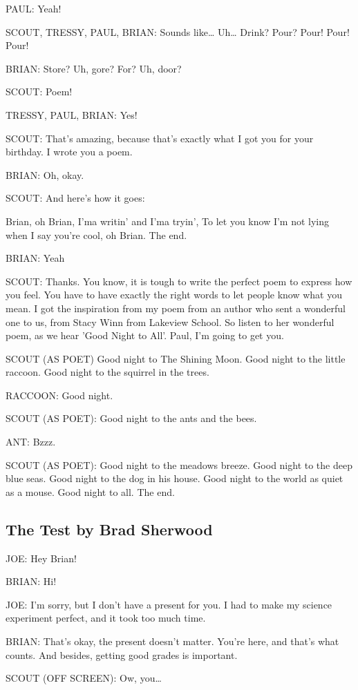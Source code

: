 PAUL:
Yeah!

SCOUT, TRESSY, PAUL, BRIAN:
Sounds like\dots
Uh\dots
Drink?
Pour? Pour! Pour! Pour!

BRIAN:
Store? Uh, gore?
For?
Uh, door?

SCOUT:
Poem!

TRESSY, PAUL, BRIAN:
Yes!

SCOUT:
That's amazing, because that's exactly what I got you for your birthday.
I wrote you a poem.

BRIAN:
Oh, okay.

SCOUT:
And here's how it goes:

Brian, oh Brian, I'ma writin' and I'ma tryin',
To let you know I'm not lying when I say you're cool, oh Brian.
The end.

BRIAN:
Yeah

SCOUT:
Thanks.
You know, it is tough to write the perfect poem to express how you feel.
You have to have exactly the right words to let people know what you mean.
I got the inspiration from my poem from an author who sent a wonderful one to us, from Stacy Winn from Lakeview School.
So listen to her wonderful poem, as we hear 'Good Night to All'.
Paul, I'm going to get you.

SCOUT (AS POET)
Good night to The Shining Moon.
Good night to the little raccoon.
Good night to the squirrel in the trees.

RACCOON:
Good night.

SCOUT (AS POET):
Good night to the ants and the bees.

ANT:
Bzzz.

SCOUT (AS POET):
Good night to the meadows breeze.
Good night to the deep blue seas.
Good night to the dog in his house.
Good night to the world as quiet as a mouse.
Good night to all.
The end.

\subsection{The Test by Brad Sherwood}

JOE:
Hey Brian!

BRIAN:
Hi!

JOE:
I'm sorry, but I don't have a present for you.
I had to make my science experiment perfect, and it took too much time.

BRIAN:
That's okay, the present doesn't matter.
You're here, and that's what counts.
And besides, getting good grades is important.

SCOUT (OFF SCREEN):
Ow, you\dots

